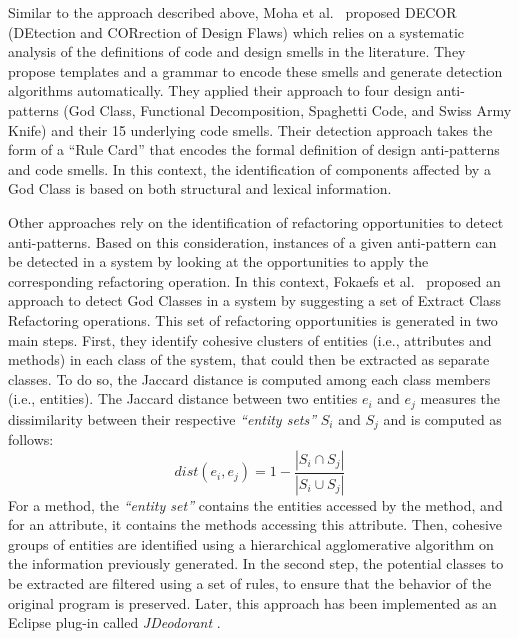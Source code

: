 Similar to the approach described above, Moha et al.~\cite{Moha10-TSE-DECOR} proposed DECOR (DEtection and CORrection of Design Flaws) which relies on a systematic analysis of the definitions of code and design smells in the literature. They propose templates and a grammar to encode these smells and generate detection algorithms automatically. They applied their approach to four design anti-patterns (God Class, Functional  Decomposition, Spaghetti Code, and Swiss Army Knife) and their 15 underlying code smells. Their detection approach takes the form of a ``Rule Card'' that encodes the formal definition of design anti-patterns and code smells. In this context, the identification of components affected by a God Class is based on both structural and lexical information.


Other approaches rely on the identification of refactoring opportunities to detect anti-patterns. Based on this consideration, instances of a given anti-pattern can be detected in a system by looking at the opportunities to apply the corresponding refactoring operation. In this context, Fokaefs et al.~\cite{fokaefs2012identification} proposed an approach to detect God Classes in a system by suggesting a set of Extract Class Refactoring operations. This set of refactoring opportunities is generated in two main steps. First, they identify cohesive clusters of entities (i.e., attributes and methods) in each class of the system, that could then be extracted as separate classes. To do so, the Jaccard distance is computed among each class members (i.e., entities). The Jaccard distance between two entities $e_{i}$ and $e_{j}$ measures the dissimilarity between their respective \textit{``entity sets''} $S_{i}$ and $S_{j}$ and is computed as follows:
\begin{equation}
\label{jaccard entity to entity}
dist(e_{i}, e_{j}) = 1 - \frac{|S_{i} \cap S_{j}|}{|S_{i} \cup S_{j}|}
\end{equation}
For a method, the \textit{``entity set''} contains the entities accessed by the method, and for an attribute, it contains the methods accessing this attribute. Then, cohesive groups of entities are identified using a hierarchical agglomerative algorithm on the information previously generated. In the second step, the potential classes to be extracted are filtered using a set of rules, to ensure that the behavior of the original program is preserved.
Later, this approach has been implemented as an Eclipse plug-in called \textit{JDeodorant} \cite{fokaefs2011jdeodorant}.

